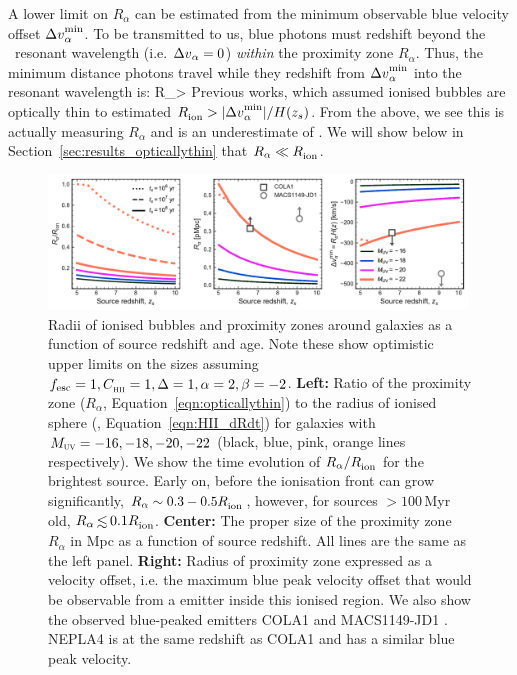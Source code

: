 \documentclass[fleqn,usenatbib]{mnras}
\begin{document}
A lower limit on $R_\alpha$ can be estimated from the minimum observable blue \lya velocity offset $\DV^\mathrm{min}_\alpha$. To be transmitted to us, blue photons must redshift beyond the \lya\ resonant wavelength (i.e. $\DV_\alpha = 0$) \textit{within} the proximity zone $R_\alpha$. Thus, the minimum distance photons travel while they redshift from $\DV^\mathrm{min}_\alpha$ into the resonant wavelength is:
%
\BE \label{eqn:opticallythin_DV}
R_\alpha > 
\EE
%
Previous works, which assumed ionised bubbles are optically thin to \lya \citep[e.g.,][]{Matthee2018b,Hashimoto2018a} estimated $\Rion > |\DV^\mathrm{min}_\alpha|/H(z_s)$. From the above, we see this is actually measuring $R_\alpha$ and is an underestimate of \Rion. We will show below in Section~\ref{sec:results_opticallythin} that $R_\alpha \ll \Rion$. 


\begin{figure}
    \includegraphics[width=0.99\textwidth]{figs/fig4.pdf}
    \caption{Radii of ionised bubbles and \lya proximity zones around galaxies as a function of source redshift and age. Note these show optimistic upper limits on the sizes assuming $\fesc=1, \clump=1, \Delta=1, \alpha=2, \beta=-2$. \textbf{Left:} Ratio of the \lya proximity zone ($R_\alpha$, Equation~\ref{eqn:opticallythin}) to the radius of ionised sphere (\Rion, Equation~\ref{eqn:HII_dRdt}) for galaxies with $\MUV = -16, -18, -20, -22$ (black, blue, pink, orange lines respectively). We show the time evolution of $R_\alpha/\Rion$ for the brightest source. Early on, before the ionisation front can grow significantly, $R_\alpha \sim 0.3-0.5 \Rion$, however, for sources $>100$\,Myr old, $R_\alpha \simlt 0.1 \Rion$. \textbf{Center:} The proper size of the proximity zone $R_\alpha$ in Mpc as a function of source redshift. All lines are the same as the left panel. \textbf{Right:} Radius of proximity zone expressed as a \lya velocity offset, i.e. the maximum \lya blue peak velocity offset that would be observable from a \lya emitter inside this ionised region. We also show the observed blue-peaked \lya emitters COLA1 \citep{Hu2016,Matthee2018b} and MACS1149-JD1 \citep{Hashimoto2018a}. NEPLA4 \citep{Songaila2018} is at the same redshift as COLA1 and has a similar blue peak velocity.}
    \label{fig:R_HII}
\end{figure}
\end{document}
